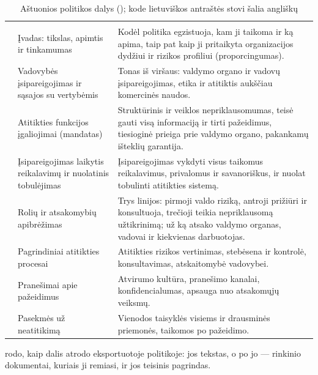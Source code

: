 \begin{xltabular}{\textwidth}{@{}L{25mm}L{43mm}Y@{}}
\caption{Aštuonios politikos dalys (); kode lietuviškos antraštės stovi šalia angliškų}\label{tab:programme:parts}\\
\toprule
{} &  &  \\
\midrule
\endfirsthead
\toprule
{} &  &  \\
\midrule
\endhead
\bottomrule
\endlastfoot
{} & Įvadas: tikslas, apimtis ir tinkamumas & Kodėl politika egzistuoja, kam ji taikoma ir ką apima, taip pat kaip ji pritaikyta organizacijos dydžiui ir rizikos profiliui (proporcingumas). \\
 & Vadovybės įsipareigojimas ir sąsajos su vertybėmis & Tonas iš viršaus: valdymo organo ir vadovų įsipareigojimas, etika ir atitiktis aukščiau komercinės naudos. \\
 & Atitikties funkcijos įgaliojimai (mandatas) & Struktūrinis ir veiklos nepriklausomumas, teisė gauti visą informaciją ir tirti pažeidimus, tiesioginė prieiga prie valdymo organo, pakankamų išteklių garantija. \\
 & Įsipareigojimas laikytis reikalavimų ir nuolatinis tobulėjimas & Įsipareigojimas vykdyti visus taikomus reikalavimus, privalomus ir savanoriškus, ir nuolat tobulinti atitikties sistemą. \\
 & Rolių ir atsakomybių apibrėžimas & Trys linijos: pirmoji valdo riziką, antroji prižiūri ir konsultuoja, trečioji teikia nepriklausomą užtikrinimą; už ką atsako valdymo organas, vadovai ir kiekvienas darbuotojas. \\
 & Pagrindiniai atitikties procesai & Atitikties rizikos vertinimas, stebėsena ir kontrolė, konsultavimas, atskaitomybė vadovybei. \\
 & Pranešimai apie pažeidimus & Atvirumo kultūra, pranešimo kanalai, konfidencialumas, apsauga nuo atsakomųjų veiksmų. \\
 & Pasekmės už neatitikimą & Vienodos taisyklės visiems ir drausminės priemonės, taikomos po pažeidimo. \\
\end{xltabular}

 rodo, kaip dalis atrodo eksportuotoje politikoje: jos tekstas,
o po jo --- rinkinio dokumentai, kuriais ji remiasi, ir jos teisinis pagrindas.

